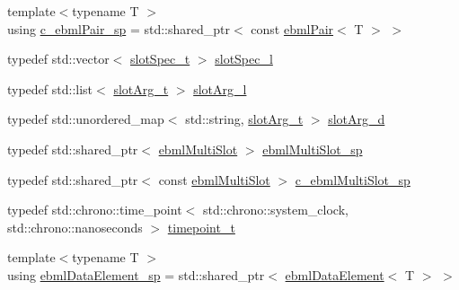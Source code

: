 \begin{DoxyCompactItemize}
\item 
{\footnotesize template$<$typename T $>$ }\\using \mbox{\hyperlink{namespaceebml_a9c804317d5b51ef8844bdffe5e8cb4b3}{c\+\_\+ebml\+Pair\+\_\+sp}} = std\+::shared\+\_\+ptr$<$ const \mbox{\hyperlink{classebml_1_1ebmlPair}{ebml\+Pair}}$<$ T $>$ $>$
\item 
typedef std\+::vector$<$ \mbox{\hyperlink{classebml_1_1slotSpec__t}{slot\+Spec\+\_\+t}} $>$ \mbox{\hyperlink{namespaceebml_abdc1248164e4e424423defac9fff7d4d}{slot\+Spec\+\_\+l}}
\item 
typedef std\+::list$<$ \mbox{\hyperlink{classebml_1_1slotArg__t}{slot\+Arg\+\_\+t}} $>$ \mbox{\hyperlink{namespaceebml_ae432575dfbb3e141ce897442794f0ca5}{slot\+Arg\+\_\+l}}
\item 
typedef std\+::unordered\+\_\+map$<$ std\+::string, \mbox{\hyperlink{classebml_1_1slotArg__t}{slot\+Arg\+\_\+t}} $>$ \mbox{\hyperlink{namespaceebml_a4317d4c495715eced3ed448c2d05caeb}{slot\+Arg\+\_\+d}}
\item 
typedef std\+::shared\+\_\+ptr$<$ \mbox{\hyperlink{classebml_1_1ebmlMultiSlot}{ebml\+Multi\+Slot}} $>$ \mbox{\hyperlink{namespaceebml_a1e633eb51fcbe25caf953fd159171543}{ebml\+Multi\+Slot\+\_\+sp}}
\item 
typedef std\+::shared\+\_\+ptr$<$ const \mbox{\hyperlink{classebml_1_1ebmlMultiSlot}{ebml\+Multi\+Slot}} $>$ \mbox{\hyperlink{namespaceebml_a2b7466e45489d2a5dbfa29b411eb4ed0}{c\+\_\+ebml\+Multi\+Slot\+\_\+sp}}
\item 
typedef std\+::chrono\+::time\+\_\+point$<$ std\+::chrono\+::system\+\_\+clock, std\+::chrono\+::nanoseconds $>$ \mbox{\hyperlink{namespaceebml_a7e667ec3fe8b51fb5b8f9690734d8638}{timepoint\+\_\+t}}
\item 
{\footnotesize template$<$typename T $>$ }\\using \mbox{\hyperlink{namespaceebml_a738c4f024d5a5af45f80985d0456ca6f}{ebml\+Data\+Element\+\_\+sp}} = std\+::shared\+\_\+ptr$<$ \mbox{\hyperlink{classebml_1_1ebmlDataElement}{ebml\+Data\+Element}}$<$ T $>$ $>$
\end{DoxyCompactItemize}
